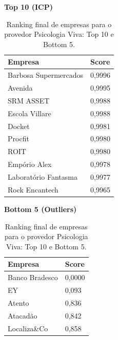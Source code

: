 \begin{table}[p]
    \centering
    \caption{Ranking final de empresas para o provedor Psicologia Viva: Top 10 e Bottom 5.}
    \label{tab:7_6_ranking_psicologiaviva}
    \begin{minipage}{0.48\textwidth}
    \centering
    \textbf{Top 10 (ICP)}\\
    \begin{tabular}{p{5cm}p{1.8cm}}
    \toprule
    Empresa & Score \\
    \midrule
    Barbosa Supermercados & 0,9996 \\
    Avenida & 0,9995 \\
    SRM ASSET & 0,9988 \\
    Escola Villare & 0,9988 \\
    Docket & 0,9981 \\
    Procfit & 0,9980 \\
    ROIT & 0,9980 \\
    Empório Alex & 0,9978 \\
    Laboratório Fantasma & 0,9977 \\
    Rock Encantech & 0,9965 \\
    \bottomrule
    \end{tabular}
    \end{minipage}\hfill
    \begin{minipage}{0.48\textwidth}
    \centering
    \textbf{Bottom 5 (Outliers)}\\
    \begin{tabular}{p{5cm}p{1.8cm}}
    \toprule
    Empresa & Score \\
    \midrule
    Banco Bradesco & 0,0000 \\
    EY & 0,093 \\
    Atento & 0,836 \\
    Atacadão & 0,842 \\
    Localiza\&Co & 0,858 \\
    \bottomrule
    \end{tabular}
    \end{minipage}
\end{table}
